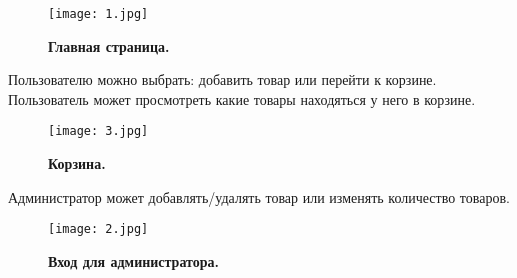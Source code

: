 \documentclass[a4paper,14pt]{extarticle} %
\begin{document}
\begin{figure}[h]
\centering
\texttt{[image: 1.jpg]}
\caption{\bf Главная страница.}
\end{figure}

Пользователю можно выбрать: добавить товар или перейти к корзине.
\newpage
Пользователь может просмотреть какие товары находяться у него в корзине.
\begin{figure}[h]
\centering
\texttt{[image: 3.jpg]}
\caption{\bf Корзина.}
\end{figure}

\newpage
Администратор может добавлять/удалять товар или изменять количество товаров.
\begin{figure}[h]
\centering
\texttt{[image: 2.jpg]}
\caption{\bf Вход для администратора.}
\end{figure}

\newpage
\end{document}
